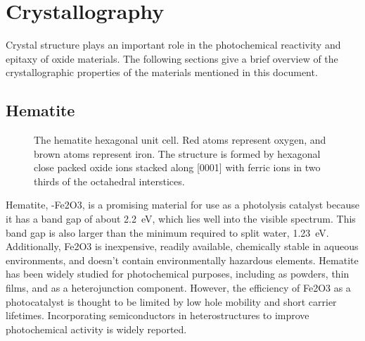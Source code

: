 \documentclass[12pt,%
              twoside,
               letterpaper]{uiothesis}
\begin{document}
\section{Crystallography}
\label{sec:background.crystallography}


Crystal structure plays an important role in the photochemical reactivity and epitaxy of
oxide materials. The following sections give a brief overview of the crystallographic
properties of the materials mentioned in this document.

\subsection{Hematite}
\label{subsec:background.hematite}

\begin{figure}
\centering
\caption[Hexagonal hematite unit cell]{%
	The hematite hexagonal unit cell. Red atoms represent oxygen, and brown atoms
represent iron.  The structure is formed by hexagonal close packed oxide ions stacked
along [0001] with ferric ions in two thirds of the octahedral interstices.}
\label{fig:hematitecell}

\end{figure}

Hematite, \textalpha-Fe2O3, is a promising material for use as a photolysis catalyst
because it has a band gap of about 2.2~eV, which lies well into the visible
spectrum.\cite{Lin:2011kw} This band gap is also larger than the minimum required to split
water, 1.23~eV. Additionally, Fe2O3 is inexpensive, readily available, chemically
stable in aqueous environments, and doesn't contain environmentally hazardous elements.
Hematite has been widely studied for photochemical purposes,\cite{Sivula:2011cc} including
as powders,\cite{GONDAL:2004df} thin films,\cite{Cao:2010dm} and as a heterojunction
component.\cite{Luo:2006kg,Wang:2007fp} However, the efficiency of Fe2O3 as a
photocatalyst is thought to be limited by low hole mobility and short carrier
lifetimes.\cite{Sivula:2011cc} Incorporating semiconductors in heterostructures to improve
photochemical activity is widely reported.\cite{Maruska:1979tr} 
\end{document}
